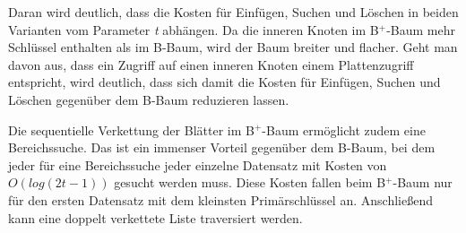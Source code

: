 Daran wird deutlich, dass die Kosten für Einfügen, Suchen und Löschen in beiden Varianten vom Parameter \textit{t} abhängen. Da die inneren Knoten im B$^+$-Baum mehr Schlüssel enthalten als im B-Baum, wird der Baum breiter und flacher. Geht man davon aus, dass ein Zugriff auf einen inneren Knoten einem Plattenzugriff entspricht, wird deutlich, dass sich damit die Kosten für Einfügen, Suchen und Löschen gegenüber dem B-Baum reduzieren lassen.

Die sequentielle Verkettung der Blätter im B$^+$-Baum ermöglicht zudem eine Bereichssuche. Das ist ein immenser Vorteil gegenüber dem B-Baum, bei dem jeder für eine Bereichssuche jeder einzelne Datensatz mit Kosten von $O(log (2t -1))$ gesucht werden muss. Diese Kosten fallen beim B$^+$-Baum nur für den ersten Datensatz mit dem kleinsten Primärschlüssel an. Anschließend kann eine doppelt verkettete Liste traversiert werden.